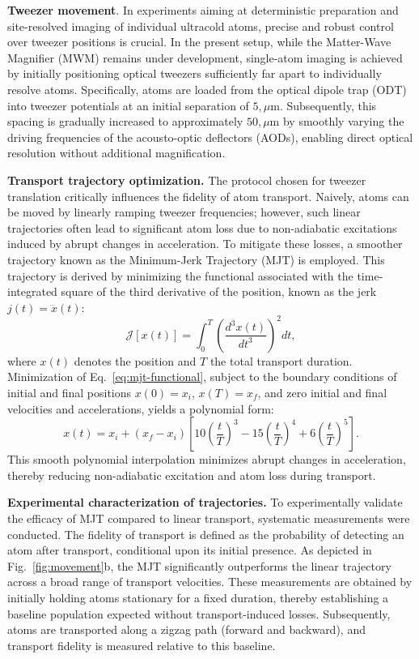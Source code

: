 \textbf{Tweezer movement}.
In experiments aiming at deterministic preparation and site-resolved imaging of individual ultracold atoms, precise and robust control over tweezer positions is crucial. In the present setup, while the Matter-Wave Magnifier (MWM) remains under development, single-atom imaging is achieved by initially positioning optical tweezers sufficiently far apart to individually resolve atoms. Specifically, atoms are loaded from the optical dipole trap (ODT) into tweezer potentials at an initial separation of $5,\mu$m. Subsequently, this spacing is gradually increased to approximately $50,\mu$m by smoothly varying the driving frequencies of the acousto-optic deflectors (AODs), enabling direct optical resolution without additional magnification.

\textbf{Transport trajectory optimization.}
The protocol chosen for tweezer translation critically influences the fidelity of atom transport. Naively, atoms can be moved by linearly ramping tweezer frequencies; however, such linear trajectories often lead to significant atom loss due to non-adiabatic excitations induced by abrupt changes in acceleration. To mitigate these losses, a smoother trajectory known as the Minimum-Jerk Trajectory (MJT) is employed. This trajectory is derived by minimizing the functional associated with the time-integrated square of the third derivative of the position, known as the jerk $j(t) = \dddot{x}(t)$:
\begin{equation}
\mathcal{J}[x(t)] = \int_{0}^{T} \left(\frac{d^3 x(t)}{dt^3}\right)^2 dt,
\label{eq:mjt-functional}
\end{equation}
where $x(t)$ denotes the position and $T$ the total transport duration. Minimization of Eq.~\eqref{eq:mjt-functional}, subject to the boundary conditions of initial and final positions $x(0) = x_i$, $x(T) = x_f$, and zero initial and final velocities and accelerations, yields a polynomial form:
\begin{equation}
x(t) = x_i + (x_f - x_i)\left[10\left(\frac{t}{T}\right)^3 - 15\left(\frac{t}{T}\right)^4 + 6\left(\frac{t}{T}\right)^5\right].
\label{eq:mjt-solution}
\end{equation}
This smooth polynomial interpolation minimizes abrupt changes in acceleration, thereby reducing non-adiabatic excitation and atom loss during transport.

\textbf{Experimental characterization of trajectories.}
To experimentally validate the efficacy of MJT compared to linear transport, systematic measurements were conducted. The fidelity of transport is defined as the probability of detecting an atom after transport, conditional upon its initial presence. As depicted in Fig.~\ref{fig:movement}b, the MJT significantly outperforms the linear trajectory across a broad range of transport velocities. These measurements are obtained by initially holding atoms stationary for a fixed duration, thereby establishing a baseline population expected without transport-induced losses. Subsequently, atoms are transported along a zigzag path (forward and backward), and transport fidelity is measured relative to this baseline.

